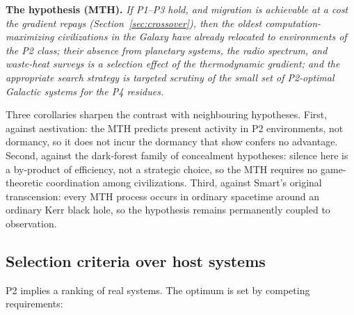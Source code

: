 \documentclass[11pt]{article}
\begin{document}
\noindent
\textbf{The hypothesis (MTH).} \emph{If P1--P3 hold, and migration is achievable at a cost the gradient repays (Section~\ref{sec:crossover}), then the oldest computation-maximizing civilizations in the Galaxy have already relocated to environments of the P2 class; their absence from planetary systems, the radio spectrum, and waste-heat surveys is a selection effect of the thermodynamic gradient; and the appropriate search strategy is targeted scrutiny of the small set of P2-optimal Galactic systems for the P4 residues.}

Three corollaries sharpen the contrast with neighbouring hypotheses. First, against aestivation: the MTH predicts present activity in P2 environments, not dormancy, so it does not incur the dormancy that \citet{Bennett2019} show confers no advantage. Second, against the dark-forest family of concealment hypotheses: silence here is a by-product of efficiency, not a strategic choice, so the MTH requires no game-theoretic coordination among civilizations. Third, against Smart's original transcension: every MTH process occurs in ordinary spacetime around an ordinary Kerr black hole, so the hypothesis remains permanently coupled to observation.

\subsection{Selection criteria over host systems}
\label{sec:selection}

P2 implies a ranking of real systems. The optimum is set by competing requirements:
\end{document}
